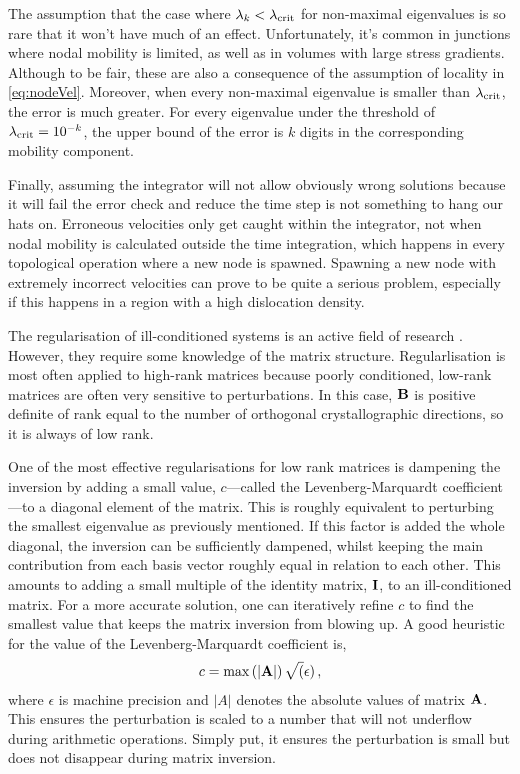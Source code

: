 The assumption that the case where $\lambda_k < \lambda_{\textrm{crit}}$ for non-maximal eigenvalues is so rare that it won't have much of an effect. Unfortunately, it's common in junctions where nodal mobility is limited, as well as in volumes with large stress gradients. Although to be fair, these are also a consequence of the assumption of locality in \cref{eq:nodeVel}. Moreover, when every non-maximal eigenvalue is smaller than $\lambda_{\textrm{crit}}$, the error is much greater. For every eigenvalue under the threshold of $\lambda_{\textrm{crit}} = 10^{-k}$, the upper bound of the error is $k$ digits in the corresponding mobility component.

Finally, assuming the integrator will not allow obviously wrong solutions because it will fail the error check and reduce the time step is not something to hang our hats on. Erroneous velocities only get caught within the integrator, not when nodal mobility is calculated outside the time integration, which happens in every topological operation where a new node is spawned. Spawning a new node with extremely incorrect velocities can prove to be quite a serious problem, especially if this happens in a region with a high dislocation density.

The regularisation of ill-conditioned systems is an active field of research \cite{regularisation1,regularisation2,regularisation3}. However, they require some knowledge of the matrix structure. Regularlisation is most often applied to high-rank matrices because poorly conditioned, low-rank matrices are often very sensitive to perturbations. In this case, $\mathbf{B}$ is positive definite of rank equal to the number of orthogonal crystallographic directions, so it is always of low rank.

One of the most effective regularisations for low rank matrices is dampening the inversion by adding a small value, $c$---called the Levenberg-Marquardt coefficient---to a diagonal element of the matrix. This is roughly equivalent to perturbing the smallest eigenvalue as previously mentioned. If this factor is added the whole diagonal, the inversion can be sufficiently dampened, whilst keeping the main contribution from each basis vector roughly equal in relation to each other. This amounts to adding a small multiple of the identity matrix, $\mathbf{I}$, to an ill-conditioned matrix. For a more accurate solution, one can iteratively refine $c$ to find the smallest value that keeps the matrix inversion from blowing up. A good heuristic for the value of the Levenberg-Marquardt coefficient is,
\begin{align}\label{eq:marquardt}
    c = \max\left(\lvert\mathbf{A}\rvert\right) \sqrt(\epsilon)\,,
\end{align}
where $\epsilon$ is machine precision and $\lvert A\rvert$ denotes the absolute values of matrix $\mathbf{A}$. This ensures the perturbation is scaled to a number that will not underflow during arithmetic operations. Simply put, it ensures the perturbation is small but does not disappear during matrix inversion.

